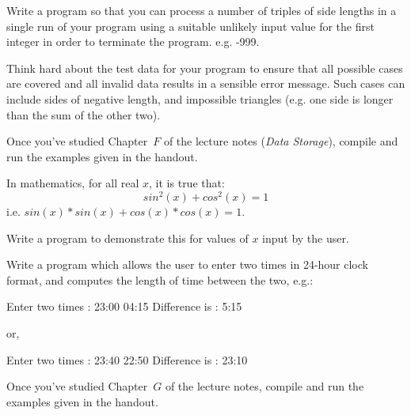 \begin{exercise}
Write a program so that you can process a number of triples of side lengths
in a single run of your program using a suitable
unlikely input value for the first integer in order to terminate
the program. e.g. -999.

Think hard about the test data for your program to ensure that
all possible cases are covered and all invalid data results in
a sensible error message. Such cases can include sides of negative length,
and impossible triangles (e.g. one side is longer than the sum of the other two).
\end{exercise}




\begin{exercise}
Once you've studied Chapter~$F$ of the lecture notes ({\em Data Storage}), 
compile and run the examples given in the handout.
\end{exercise}

In mathematics, for all real $x$, it is true that:
\[
sin^2(x) + cos^2(x) = 1
\]
i.e. $sin(x)*sin(x) + cos(x)*cos(x) = 1$.\\

\begin{exercise}
Write a program to demonstrate this for values of $x$ input by the user.
\end{exercise}

\begin{exercise}
Write a program which allows the user to enter two times in
24-hour clock format, and computes the length of time between the
two, e.g.:
\begin{terminaloutput}
Enter two times : 23:00 04:15
Difference is : 5:15
\end{terminaloutput}
or,
\begin{terminaloutput}
Enter two times : 23:40 22:50
Difference is : 23:10
\end{terminaloutput}
\end{exercise}





\begin{exercise}
Once you've studied Chapter~$G$ of the lecture notes, 
compile and run the examples given in the handout.
\end{exercise}

